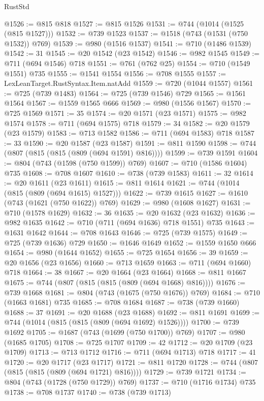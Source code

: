 \begin{lexlean}{RustStd}
\begin{coremodule}
@1526 := @815 @818
@1527 := @815 @1526
@1531 := @744 (@1014 (@1525 (@815 @1527)))
@1532 := @739 @1523
@1537 := @1518 (@743 (@1531 (@750 @1532)) @769)
@1539 := @980 (@1516 @1537)
@1541 := @710 (@1486 @1539)
@1542 := 31
@1545 := @20 @1542 (@23 @1542)
@1546 := @982 @1545
@1549 := @711 (@694 @1546) @718
@1551 := @761 (@762 @25)
@1554 := @710 (@1549 @1551) @735
@1555 := @1541 @1554
@1556 := @708 @1555
@1557 := LexLeanTarget.RustSyntax.Item.natAdd
@1559 := @720 (@1044 @1557)
@1561 := @725 (@739 @1483)
@1564 := @725 (@739 @1546) @729
@1565 := @1561 @1564
@1567 := @1559 @1565 @666
@1569 := @980 (@1556 @1567)
@1570 := @725 @1569
@1571 := 35
@1574 := @20 @1571 (@23 @1571)
@1575 := @982 @1574
@1578 := @711 (@694 @1575) @718
@1579 := 34
@1582 := @20 @1579 (@23 @1579)
@1583 := @713 @1582
@1586 := @711 (@694 @1583) @718
@1587 := 33
@1590 := @20 @1587 (@23 @1587)
@1591 := @811 @1590
@1598 := @744 (@807 (@815 (@815 (@809 (@694 @1591) @816))))
@1599 := @739 @1591
@1604 := @804 (@743 (@1598 (@750 @1599)) @769)
@1607 := @710 (@1586 @1604) @735
@1608 := @708 @1607
@1610 := @738 (@739 @1583)
@1611 := 32
@1614 := @20 @1611 (@23 @1611)
@1615 := @811 @1614
@1621 := @744 (@1014 (@815 (@809 (@694 @1615) @1527)))
@1622 := @739 @1615
@1627 := @1610 (@743 (@1621 (@750 @1622)) @769)
@1629 := @980 (@1608 @1627)
@1631 := @710 (@1578 @1629)
@1632 := 36
@1635 := @20 @1632 (@23 @1632)
@1636 := @982 @1635
@1642 := @710 (@711 (@694 @1636) @718 @1551) @735
@1643 := @1631 @1642
@1644 := @708 @1643
@1646 := @725 (@739 @1575)
@1649 := @725 (@739 @1636) @729
@1650 := @1646 @1649
@1652 := @1559 @1650 @666
@1654 := @980 (@1644 @1652)
@1655 := @725 @1654
@1656 := 39
@1659 := @20 @1656 (@23 @1656)
@1660 := @713 @1659
@1663 := @711 (@694 @1660) @718
@1664 := 38
@1667 := @20 @1664 (@23 @1664)
@1668 := @811 @1667
@1675 := @744 (@807 (@815 (@815 (@809 (@694 @1668) @816))))
@1676 := @739 @1668
@1681 := @804 (@743 (@1675 (@750 @1676)) @769)
@1684 := @710 (@1663 @1681) @735
@1685 := @708 @1684
@1687 := @738 (@739 @1660)
@1688 := 37
@1691 := @20 @1688 (@23 @1688)
@1692 := @811 @1691
@1699 := @744 (@1014 (@815 (@815 (@809 (@694 @1692) @1526))))
@1700 := @739 @1692
@1705 := @1687 (@743 (@1699 (@750 @1700)) @769)
@1707 := @980 (@1685 @1705)
@1708 := @725 @1707
@1709 := 42
@1712 := @20 @1709 (@23 @1709)
@1713 := @713 @1712
@1716 := @711 (@694 @1713) @718
@1717 := 41
@1720 := @20 @1717 (@23 @1717)
@1721 := @811 @1720
@1728 := @744 (@807 (@815 (@815 (@809 (@694 @1721) @816))))
@1729 := @739 @1721
@1734 := @804 (@743 (@1728 (@750 @1729)) @769)
@1737 := @710 (@1716 @1734) @735
@1738 := @708 @1737
@1740 := @738 (@739 @1713)

\end{coremodule}
\end{lexlean}
